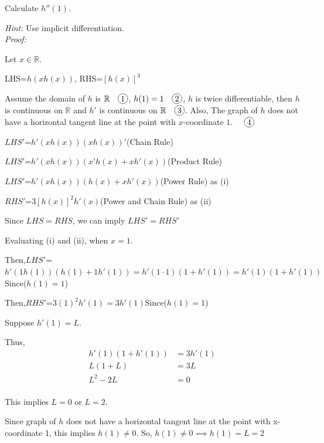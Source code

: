 \documentclass[12pt]{exam}
\newcommand*\circled[1]{\tikz[baseline=(char.base)]{
    \node[shape=circle, draw, inner sep=1pt, 
        minimum height=12pt] (char) {#1};}}
\newcommand {\DS} [1] {${\displaystyle #1}$}
\newcommand{\vv}{\vspace{.4cm}}
\newcommand{\R}{\mathbb{R}}
\newcommand*\circled[1]{\tikz[baseline=(char.base)]{
    \node[shape=circle, draw, inner sep=1pt, 
        minimum height=12pt] (char) {#1};}}
\begin{document}
\begin{enumerate}[resume]
	Calculate \DS{h''(1)}.
	
	\emph{Hint:} Use implicit differentiation.
	\vv
	\\
	
	\emph{Proof:}

	Let $x\in\R$.

	LHS=$h(xh(x))$, RHS=$[h(x)]^3$

	Assume the domain of $h$ is $\R \quad \circled{1}$, $h(1)=1 \quad \circled{2}$,
	$h$ is twice differentiable, 
	then $h$ is continuous on $\R$ and $h'$ is continuous on $\R \quad \circled{3}$.
	Also, The graph of $h$ does not have a horizontal tangent line at the point with $x$-coordinate $1$. $\quad \circled{4}$

	\DS{LHS'}=$h'(xh(x))(xh(x))'$\qquad(Chain Rule)

	\DS{LHS'}=$h'(xh(x))(x'h(x)+xh'(x))$\qquad(Product Rule)

	\DS{LHS'}=$h'(xh(x))(h(x)+xh'(x))$\qquad(Power Rule) as \quad (i)

	\DS{RHS'}=$3[h(x)]^2h'(x)$\qquad(Power and Chain Rule) as \quad (ii)

	Since $LHS=RHS$, we can imply $LHS'=RHS'$

	Evaluating (i) and (ii), when $x=1$. 

	Then,\DS{LHS'}=$h'(1h(1))(h(1)+1h'(1))=h'(1\cdot1)(1+h'(1))=h'(1)(1+h'(1))$\qquad Since($h(1)=1$)

	Then,\DS{RHS'}=$3(1)^2h'(1)=3h'(1)$\qquad Since($h(1)=1$)

	Suppose $h'(1)=L.$

	Thus,
	\begin{align*}
	    h'(1)(1+h'(1))&=3h'(1) \\
	    L(1+L)&=3L \\
	    L^2-2L&=0 \\
	\end{align*}


	This implies $L=0$ or $L=2.$

	Since graph of $h$ does not have a horizontal tangent line at the point with x-coordinate 1, this implies $h(1)\neq0$.
	So, $h(1)\neq 0 \implies h(1)=L=2$\\


\end{enumerate}
\end{document}
